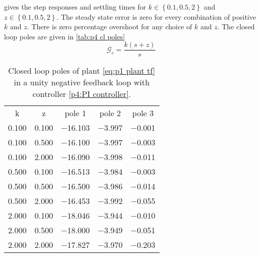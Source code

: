 \problem

 gives the step responses and settling times for $k\in\left\{0.1,0.5,2\right\}$ and $z\in\left\{0.1,0.5,2\right\}$. The steady state error is zero for every combination of positive $k$ and $z$. There is zero percentage overshoot for any choice of $k$ and $z$. The closed loop poles are given in \cref{tab:p4 cl poles}
\begin{equation}
	\label{p4:PI controller}
	\mathcal{G}_c = \frac{k(s+z)}{s}
\end{equation}


\begin{table}[h]
	\centering
	\begin{tabular}{ccccc}
		\toprule
		k & z & pole 1 & pole 2 & pole 3\\
		\cmidrule(r){1-1}\cmidrule(lr){2-2}\cmidrule(lr){3-5}
		\num{0.100} & \num{0.100} & \num{-16.103} & \num{-3.997} & \num{-0.001}\\
		\num{0.100} & \num{0.500} & \num{-16.100} & \num{-3.997} & \num{-0.003}\\
		\num{0.100} & \num{2.000} & \num{-16.090} & \num{-3.998} & \num{-0.011}\\
		\num{0.500} & \num{0.100} & \num{-16.513} & \num{-3.984} & \num{-0.003}\\
		\num{0.500} & \num{0.500} & \num{-16.500} & \num{-3.986} & \num{-0.014}\\
		\num{0.500} & \num{2.000} & \num{-16.453} & \num{-3.992} & \num{-0.055}\\
		\num{2.000} & \num{0.100} & \num{-18.046} & \num{-3.944} & \num{-0.010}\\
		\num{2.000} & \num{0.500} & \num{-18.000} & \num{-3.949} & \num{-0.051}\\
		\num{2.000} & \num{2.000} & \num{-17.827} & \num{-3.970} & \num{-0.203}\\
		\bottomrule
	\end{tabular}
	\caption{Closed loop poles of plant \cref{eq:p1 plant tf} in a unity negative feedback loop with controller \cref{p4:PI controller}.}
	\label{p4:cl poles}
\end{table}